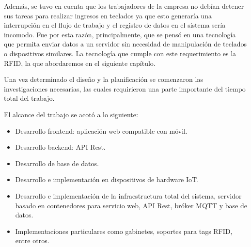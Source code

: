 Además, se tuvo en cuenta que los trabajadores de la empresa no debían detener sus tareas para realizar ingresos en teclados ya que esto generaría una interrupción en el flujo de trabajo y el registro de datos en el sistema sería incomodo. Fue por esta razón, principalmente, que se pensó en una tecnología que permita enviar datos a un servidor sin necesidad de manipulación de teclados o dispositivos similares. La tecnología que cumple con este requerimiento es la RFID, la que abordaremos en el siguiente capítulo.

Una vez determinado el diseño y la planificación se comenzaron las investigaciones necesarias, las cuales requirieron una parte importante del tiempo total del trabajo.

El alcance del trabajo se acotó a lo siguiente:

\begin{itemize}
	\item Desarrollo frontend: aplicación web compatible con móvil.
	\item Desarrollo backend: API Rest.
	\item Desarrollo de base de datos.
	\item Desarrollo e implementación en dispositivos de hardware IoT.
	\item Desarrollo e implementación de la infraestructura total del sistema, servidor basado en contenedores para servicio web, API Rest, bróker MQTT y base de datos. 
	\item Implementaciones particulares como gabinetes, soportes para tags RFID, entre otros.                  
\end{itemize}
%
%
%
